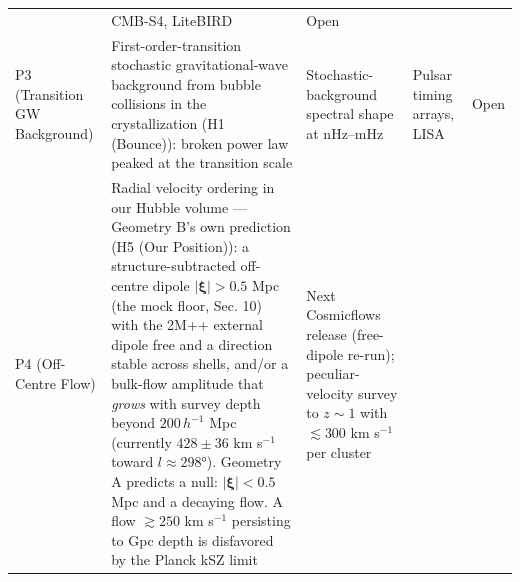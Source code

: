 \documentclass[
]{article}
\begin{document}
\begin{longtable}[]{@{}lllll@{}}
\begin{minipage}[t]{0.19\columnwidth}
\end{minipage} & \begin{minipage}[t]{0.19\columnwidth}\raggedright
CMB-S4, LiteBIRD\strut
\end{minipage} & \begin{minipage}[t]{0.19\columnwidth}\raggedright
Open\strut
\end{minipage}\tabularnewline
\begin{minipage}[t]{0.11\columnwidth}\raggedright
P3 (Transition GW Background)\strut
\end{minipage} & \begin{minipage}[t]{0.19\columnwidth}\raggedright
First-order-transition stochastic gravitational-wave background from
bubble collisions in the crystallization (H1 (Bounce)): broken power law
peaked at the transition scale\strut
\end{minipage} & \begin{minipage}[t]{0.19\columnwidth}\raggedright
Stochastic-background spectral shape at nHz--mHz\strut
\end{minipage} & \begin{minipage}[t]{0.19\columnwidth}\raggedright
Pulsar timing arrays, LISA\strut
\end{minipage} & \begin{minipage}[t]{0.19\columnwidth}\raggedright
Open\strut
\end{minipage}\tabularnewline
\begin{minipage}[t]{0.11\columnwidth}\raggedright
P4 (Off-Centre Flow)\strut
\end{minipage} & \begin{minipage}[t]{0.19\columnwidth}\raggedright
Radial velocity ordering in our Hubble volume --- Geometry B's own
prediction (H5 (Our Position)): a structure-subtracted off-centre dipole
\(|\boldsymbol{\xi}| > 0.5\) Mpc (the mock floor, Sec. 10) with the 2M++
external dipole free and a direction stable across shells, and/or a
bulk-flow amplitude that \emph{grows} with survey depth beyond
\(200\,h^{-1}\) Mpc (currently \(428 \pm 36\) km s\(^{-1}\) toward
\(l \approx 298°\)). Geometry A predicts a null:
\(|\boldsymbol{\xi}| < 0.5\) Mpc and a decaying flow. A flow
\(\gtrsim 250\) km s\(^{-1}\) persisting to Gpc depth is disfavored by
the Planck kSZ limit\strut
\end{minipage} & \begin{minipage}[t]{0.19\columnwidth}\raggedright
Next Cosmicflows release (free-dipole re-run); peculiar-velocity survey
to \(z \sim 1\) with \(\lesssim 300\) km s\(^{-1}\) per cluster\strut

\end{minipage}
\end{longtable}
\end{document}
